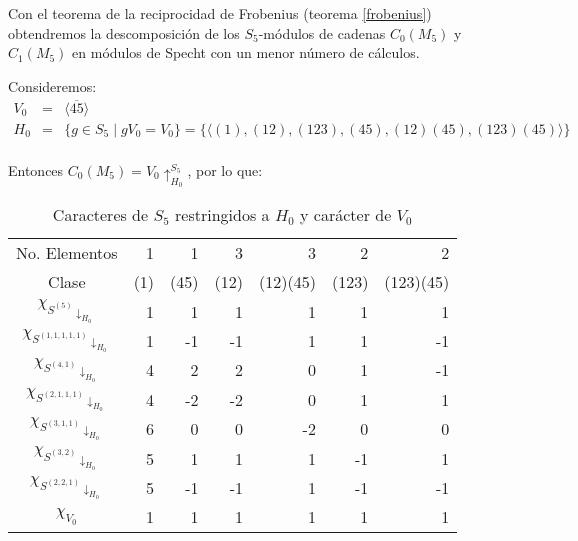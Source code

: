 \documentclass[12pt]{book}
\theoremstyle{definition}
\newcounter{in}
\begin{document}
Con el teorema de la reciprocidad de Frobenius (teorema
\ref{frobenius}) obtendremos la descomposición de los $S_{5}$-módulos de
cadenas $C_{0}(M_{5})$ y $C_{1}(M_{5})$ en módulos de Specht con un
menor número de cálculos. 

Consideremos:
\begin{eqnarray*}
  V_{0}&=&\langle\overline{45}\rangle\\
  H_{0}&=&\{g\in S_{5}\mid gV_{0}=V_{0}\}=\{\langle(1),(12),(123),(45),(12)(45),(123)(45)\rangle\}\\
\end{eqnarray*}

Entonces $C_{0}(M_{5})=V_{0}\uparrow^{S_{5}}_{H_0}$, por lo que:

\begin{table}[!hbtp]
  \centering
    \begin{tabular}{c |r r r r r r}
      No. Elementos& 1 & 1 & 3 & 3 & 2 & 2 \\
      Clase & (1) & (45) & (12) & (12)(45) & (123) & (123)(45) \\
      \hline
      $\chi_{S^{(5)}\downarrow_{H_{0}}}$       & 1 & 1 & 1 & 1 & 1 & 1 \\
      $\chi_{S^{(1,1,1,1,1)}\downarrow_{H_{0}}}$ & 1 & -1 & -1 & 1 & 1 & -1 \\
      $\chi_{S^{(4,1)}\downarrow_{H_{0}}}$      & 4 & 2 & 2 & 0 & 1 & -1 \\
      $\chi_{S^{(2,1,1,1)}\downarrow_{H_{0}}}$   & 4 & -2 & -2 & 0 & 1 & 1 \\
      $\chi_{S^{(3,1,1)}\downarrow_{H_{0}}}$     & 6 & 0 & 0 & -2 & 0 & 0 \\
      $\chi_{S^{(3,2)}\downarrow_{H_{0}}}$      & 5 & 1 & 1 & 1 & -1 & 1 \\
      $\chi_{S^{(2,2,1)}\downarrow_{H_{0}}}$    & 5 & -1 & -1 & 1 & -1 & -1 \\
      \hline
      $\chi_{V_{0}}$ & 1 & 1 & 1 & 1 & 1 & 1 \\
    \end{tabular}

\caption{Caracteres de $S_{5}$ restringidos a $H_{0}$ y carácter de $V_{0}$}
\label{tab:restriccion-H_0}
\end{table}
\end{document}
